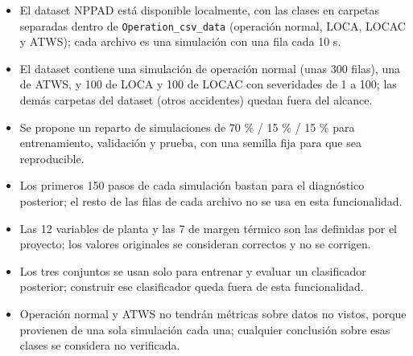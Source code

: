 \documentclass[12pt,a4paper]{article}
\providecommand{\tightlist}{\setlength{\itemsep}{0pt}\setlength{\parskip}{0pt}}
\newenvironment{documentogenerado}[2]{%
  \def\doccomando{#1}\def\docruta{#2}%
  \par\begingroup\small\setstretch{1.15}\sloppy%
}{\endgroup\par\medskip}
\begin{document}
\begin{documentogenerado}{/speckit-specify + /speckit-clarify}{specs\slash 001-preparacion-datos\slash spec.md}
\begin{itemize}
\tightlist
\item
  El dataset NPPAD está disponible localmente, con las clases en carpetas separadas dentro de \texttt{Operation\_\allowbreak{}csv\_\allowbreak{}data} (operación normal, LOCA, LOCAC y ATWS); cada archivo es una simulación con una fila cada 10 s.
\item
  El dataset contiene una simulación de operación normal (unas 300 filas), una de ATWS, y 100 de LOCA y 100 de LOCAC con severidades de 1 a 100; las demás carpetas del dataset (otros accidentes) quedan fuera del alcance.
\item
  Se propone un reparto de simulaciones de 70 \% / 15 \% / 15 \% para entrenamiento, validación y prueba, con una semilla fija para que sea reproducible.
\item
  Los primeros 150 pasos de cada simulación bastan para el diagnóstico posterior; el resto de las filas de cada archivo no se usa en esta funcionalidad.
\item
  Las 12 variables de planta y las 7 de margen térmico son las definidas por el proyecto; los valores originales se consideran correctos y no se corrigen.
\item
  Los tres conjuntos se usan solo para entrenar y evaluar un clasificador posterior; construir ese clasificador queda fuera de esta funcionalidad.
\item
  Operación normal y ATWS no tendrán métricas sobre datos no vistos, porque provienen de una sola simulación cada una; cualquier conclusión sobre esas clases se considera no verificada.
\end{itemize}
\end{documentogenerado}
\end{document}
